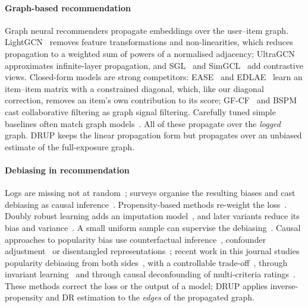 \documentclass[preprint,review,12pt,authoryear]{elsarticle}
\theoremstyle{definition}
\begin{document}
\paragraph{Graph-based recommendation}
Graph neural recommenders propagate embeddings over the user--item graph.
LightGCN~\citep{he2020lightgcn} removes feature transformations and
non-linearities, which reduces propagation to a weighted sum of powers of a
normalised adjacency; UltraGCN~\citep{mao2021ultragcn} approximates
infinite-layer propagation, and SGL~\citep{wu2021sgl} and
SimGCL~\citep{yu2022simgcl} add contrastive views. Closed-form models are strong
competitors: EASE~\citep{steck2019ease} and EDLAE~\citep{steck2020edlae} learn an
item--item matrix with a constrained diagonal, which, like our diagonal
correction, removes an item's own contribution to its score;
GF-CF~\citep{shen2021gfcf} and BSPM~\citep{choi2023bspm} cast collaborative
filtering as graph signal filtering. Carefully tuned simple baselines often
match graph models~\citep{anelli2023myth}. All of these propagate over the
\emph{logged} graph. DRUP keeps the linear propagation form but propagates over
an unbiased estimate of the full-exposure graph.

\paragraph{Debiasing in recommendation}
Logs are missing not at random~\citep{marlin2009collaborative}; surveys organise
the resulting biases and cast debiasing as causal
inference~\citep{chen2023bias,gao2024causalsurvey}. Propensity-based methods
re-weight the loss~\citep{schnabel2016,swaminathan2015snips,saito2020unbiased}.
Doubly robust learning adds an imputation model~\citep{wang2019drjl}, and later
variants reduce its bias and variance~\citep{guo2021mrdr,dai2022gdr,li2023stabledr}.
A small uniform sample can supervise the debiasing~\citep{chen2021autodebias}.
Causal approaches to popularity bias use counterfactual
inference~\citep{wei2021macr}, confounder adjustment~\citep{zhang2021pda} or
disentangled representations~\citep{zheng2021dice}; recent work in this journal
studies popularity debiasing from both sides~\citep{boratto2021connecting}, with a
controllable trade-off~\citep{okamura2024flexibly}, through invariant
learning~\citep{bai2025invariant} and through causal deconfounding of
multi-criteria ratings~\citep{guo2026confounding}. These methods correct the loss
or the output of a model; DRUP applies inverse-propensity and DR estimation to the
\emph{edges} of the propagated graph.
\end{document}
